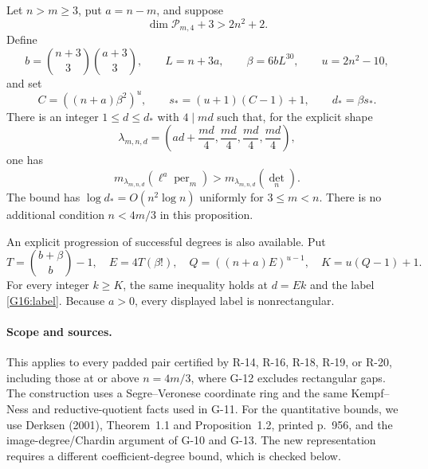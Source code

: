 \begin{proposition}\label{G-16}
Let $n>m\geq3$, put $a=n-m$, and suppose
\begin{equation}\label{G16:dimensionhypothesis}
 \dim\mathcal P_{m,4}+3>2n^2+2.
\end{equation}
Define
\[
 b=\binom{n+3}{3}\binom{a+3}{3},\qquad L=n+3a,
 \qquad \beta=6bL^{30},\qquad u=2n^2-10,
\]
and set
\begin{equation}\label{G16:firstdegree}
 C=((n+a)\beta^2)^u,\qquad
 s_*=(u+1)(C-1)+1,\qquad d_* =\beta s_*.
\end{equation}
There is an integer $1\leq d\leq d_*$ with $4\mid md$ such that,
for the explicit shape
\begin{equation}\label{G16:label}
 \lambda_{m,n,d}=
 \left(ad+\frac{md}{4},\frac{md}{4},\frac{md}{4},\frac{md}{4}\right),
\end{equation}
one has
\[
 m_{\lambda_{m,n,d}}(\ell^a\operatorname{per}_m)
       >m_{\lambda_{m,n,d}}(\det_n).
\]
The bound has $\log d_*=O(n^2\log n)$ uniformly for $3\leq m<n$.
There is no additional condition $n<4m/3$ in this proposition.

An explicit progression of successful degrees is also available. Put
\[
 T=\binom{b+\beta}{b}-1,\quad E=4T(\beta!),\quad
 Q=((n+a)E)^{u-1},\quad K=u(Q-1)+1.
\]
For every integer $k\geq K$, the same inequality holds at
$d=Ek$ and the label \eqref{G16:label}.
Because $a>0$, every displayed label is nonrectangular.
\end{proposition}

\paragraph{Scope and sources.}
This applies to every padded pair certified by R-14, R-16, R-18,
R-19, or R-20, including those at or above $n=4m/3$, where G-12
excludes rectangular gaps. The construction uses a Segre--Veronese
coordinate ring and the same Kempf--Ness and reductive-quotient
facts used in G-11. For the quantitative bounds, we use Derksen
(2001), Theorem~1.1 and Proposition~1.2, printed p.~956, and the
image-degree/Chardin argument of G-10 and G-13. The new representation
requires a different coefficient-degree bound, which is checked below.

